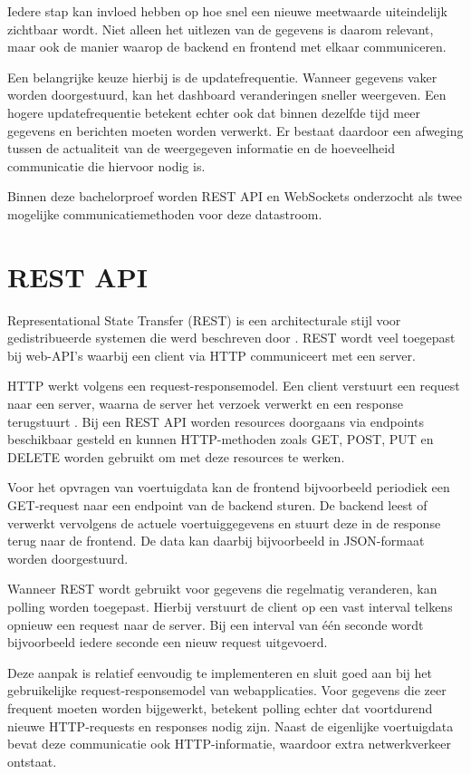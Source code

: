 Iedere stap kan invloed hebben op hoe snel een nieuwe meetwaarde uiteindelijk
zichtbaar wordt. Niet alleen het uitlezen van de gegevens is daarom relevant,
maar ook de manier waarop de backend en frontend met elkaar communiceren.

Een belangrijke keuze hierbij is de updatefrequentie. Wanneer gegevens vaker
worden doorgestuurd, kan het dashboard veranderingen sneller weergeven. Een
hogere updatefrequentie betekent echter ook dat binnen dezelfde tijd meer
gegevens en berichten moeten worden verwerkt. Er bestaat daardoor een afweging
tussen de actualiteit van de weergegeven informatie en de hoeveelheid
communicatie die hiervoor nodig is.

Binnen deze bachelorproef worden REST API en WebSockets onderzocht als twee
mogelijke communicatiemethoden voor deze datastroom.

\section{REST API}
Representational State Transfer (REST) is een architecturale stijl voor
gedistribueerde systemen die werd beschreven door \textcite{Fielding2000}. 
REST wordt veel toegepast bij web-API's waarbij een client via HTTP communiceert met een server.

HTTP werkt volgens een request-responsemodel. Een client verstuurt een request
naar een server, waarna de server het verzoek verwerkt en een response
terugstuurt \autocite{RFC9110}. Bij een REST API worden resources doorgaans via
endpoints beschikbaar gesteld en kunnen HTTP-methoden zoals GET, POST, PUT en
DELETE worden gebruikt om met deze resources te werken.

Voor het opvragen van voertuigdata kan de frontend bijvoorbeeld periodiek een
GET-request naar een endpoint van de backend sturen. De backend leest of
verwerkt vervolgens de actuele voertuiggegevens en stuurt deze in de response
terug naar de frontend. De data kan daarbij bijvoorbeeld in JSON-formaat worden
doorgestuurd.

Wanneer REST wordt gebruikt voor gegevens die regelmatig veranderen, kan
polling worden toegepast. Hierbij verstuurt de client op een vast interval
telkens opnieuw een request naar de server. Bij een interval van één seconde
wordt bijvoorbeeld iedere seconde een nieuw request uitgevoerd.

Deze aanpak is relatief eenvoudig te implementeren en sluit goed aan bij het
gebruikelijke request-responsemodel van webapplicaties. Voor gegevens die zeer
frequent moeten worden bijgewerkt, betekent polling echter dat voortdurend
nieuwe HTTP-requests en responses nodig zijn. Naast de eigenlijke voertuigdata
bevat deze communicatie ook HTTP-informatie, waardoor extra netwerkverkeer
ontstaat.

